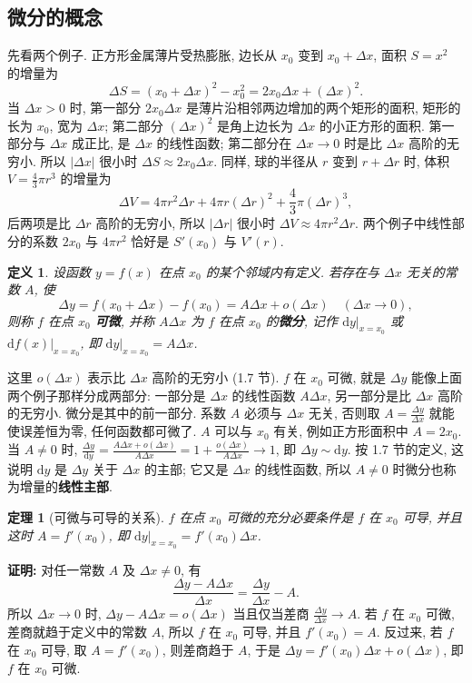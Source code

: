 \documentclass[UTF8,openany]{ctexbook}
\theoremstyle{chinesetextbook}
\newenvironment{cnproof}{\par\indent\textbf{证明:} \ignorespaces}{\par}
\newtheorem*{definitionsingle}{定义}
\newtheorem*{theoremsingle}{定理}
\newcommand{\dd}{\mathrm d}
\begin{document}
\subsection{微分的概念}
先看两个例子. 正方形金属薄片受热膨胀, 边长从 $x_0$ 变到 $x_0+\Delta x$, 面积 $S=x^2$ 的增量为
\[
\Delta S=(x_0+\Delta x)^2-x_0^2=2x_0\Delta x+(\Delta x)^2.
\]
当 $\Delta x>0$ 时, 第一部分 $2x_0\Delta x$ 是薄片沿相邻两边增加的两个矩形的面积, 矩形的长为 $x_0$, 宽为 $\Delta x$; 第二部分 $(\Delta x)^2$ 是角上边长为 $\Delta x$ 的小正方形的面积. 第一部分与 $\Delta x$ 成正比, 是 $\Delta x$ 的线性函数; 第二部分在 $\Delta x\to0$ 时是比 $\Delta x$ 高阶的无穷小. 所以 $|\Delta x|$ 很小时 $\Delta S\approx2x_0\Delta x$. 同样, 球的半径从 $r$ 变到 $r+\Delta r$ 时, 体积 $\displaystyle V=\frac43\pi r^3$ 的增量为
\[
\Delta V=4\pi r^2\Delta r+4\pi r(\Delta r)^2+\frac43\pi(\Delta r)^3,
\]
后两项是比 $\Delta r$ 高阶的无穷小, 所以 $|\Delta r|$ 很小时 $\Delta V\approx4\pi r^2\Delta r$. 两个例子中线性部分的系数 $2x_0$ 与 $4\pi r^2$ 恰好是 $S'(x_0)$ 与 $V'(r)$.
\begin{definitionsingle}
设函数 $y=f(x)$ 在点 $x_0$ 的某个邻域内有定义. 若存在与 $\Delta x$ 无关的常数 $A$, 使
\[
\Delta y=f(x_0+\Delta x)-f(x_0)=A\Delta x+o(\Delta x)\quad(\Delta x\to0),
\]
则称 $f$ 在点 $x_0$ \textbf{可微}, 并称 $A\Delta x$ 为 $f$ 在点 $x_0$ 的\textbf{微分}, 记作 $\dd y\big|_{x=x_0}$ 或 $\dd f(x)\big|_{x=x_0}$, 即 $\dd y\big|_{x=x_0}=A\Delta x$.
\end{definitionsingle}
这里 $o(\Delta x)$ 表示比 $\Delta x$ 高阶的无穷小 (1.7 节). $f$ 在 $x_0$ 可微, 就是 $\Delta y$ 能像上面两个例子那样分成两部分: 一部分是 $\Delta x$ 的线性函数 $A\Delta x$, 另一部分是比 $\Delta x$ 高阶的无穷小. 微分是其中的前一部分. 系数 $A$ 必须与 $\Delta x$ 无关, 否则取 $\displaystyle A=\frac{\Delta y}{\Delta x}$ 就能使误差恒为零, 任何函数都可微了. $A$ 可以与 $x_0$ 有关, 例如正方形面积中 $A=2x_0$. 当 $A\ne0$ 时, $\displaystyle\frac{\Delta y}{\dd y}=\frac{A\Delta x+o(\Delta x)}{A\Delta x}=1+\frac{o(\Delta x)}{A\Delta x}\to1$, 即 $\Delta y\sim\dd y$. 按 1.7 节的定义, 这说明 $\dd y$ 是 $\Delta y$ 关于 $\Delta x$ 的主部; 它又是 $\Delta x$ 的线性函数, 所以 $A\ne0$ 时微分也称为增量的\textbf{线性主部}.
\begin{theoremsingle}[可微与可导的关系]
$f$ 在点 $x_0$ 可微的充分必要条件是 $f$ 在 $x_0$ 可导, 并且这时 $A=f'(x_0)$, 即 $\dd y\big|_{x=x_0}=f'(x_0)\Delta x$.
\end{theoremsingle}
\begin{cnproof}
对任一常数 $A$ 及 $\Delta x\ne0$, 有
\[
\frac{\Delta y-A\Delta x}{\Delta x}=\frac{\Delta y}{\Delta x}-A.
\]
所以 $\Delta x\to0$ 时, $\Delta y-A\Delta x=o(\Delta x)$ 当且仅当差商 $\displaystyle\frac{\Delta y}{\Delta x}\to A$. 若 $f$ 在 $x_0$ 可微, 差商就趋于定义中的常数 $A$, 所以 $f$ 在 $x_0$ 可导, 并且 $f'(x_0)=A$. 反过来, 若 $f$ 在 $x_0$ 可导, 取 $A=f'(x_0)$, 则差商趋于 $A$, 于是 $\Delta y=f'(x_0)\Delta x+o(\Delta x)$, 即 $f$ 在 $x_0$ 可微.
\end{cnproof}
\end{document}
